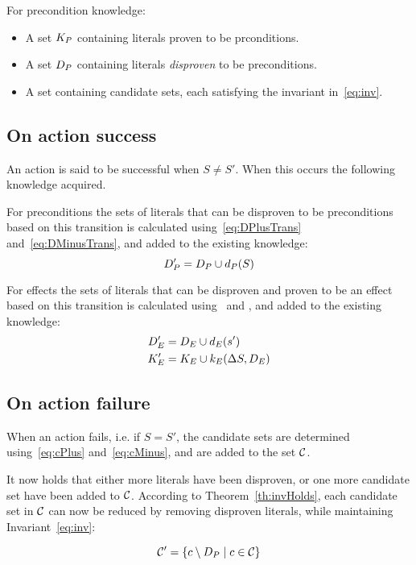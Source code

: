 \documentclass[\master/Master.tex]{subfiles}
\begin{document}
For precondition knowledge:
\begin{itemize}
    \item A set $K_P$ containing literals proven to be prconditions.
	\item A set $D_P$ containing literals \emph{disproven} to be preconditions.
    \item A set \cset containing candidate sets, each satisfying the invariant in~\eqref{eq:inv}.
\end{itemize}

\subsection*{On action success}
An action is said to be successful when $S \neq S'$. When this occurs the following knowledge acquired.

For preconditions the sets of literals that can be disproven to be preconditions based on this transition is calculated using~\eqref{eq:DPlusTrans} and~\eqref{eq:DMinusTrans}, and added to the existing knowledge:
\begin{equation*}
    D_P' = D_P \cup d_P(S)
\end{equation*}

For effects the sets of literals that can be disproven and proven to be an effect based on this transition is calculated using~ and , and added to the existing knowledge:
\begin{align*}
D_E' &= D_E \cup d_E(s') \\
K_E' &= K_E \cup k_E(\Delta S, D_E)
\end{align*}


\subsection*{On action failure}

When an action fails, i.e. if $S = S'$, the candidate sets are determined using~\eqref{eq:cPlus} and~\eqref{eq:cMinus}, and are added to the set $\mathcal{C}$.

It now holds that either more literals have been disproven, or one more candidate set have been added to $\mathcal{C}$. According to Theorem~\ref{th:invHolds}, each candidate set in $\mathcal{C}$ can now be reduced by removing disproven literals, while maintaining Invariant~\eqref{eq:inv}:

\begin{equation} \label{reduceCands}
    \mathcal{C}' = \left\{ c \setminus D_P \; | \; c \in \mathcal{C} \right\}
\end{equation}
\end{document}
